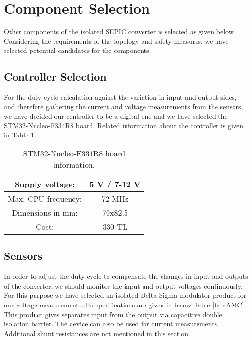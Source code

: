 \section{Component Selection}
Other components of the isolated SEPIC converter is selected as given below. Considering the requirements of the topology and safety measures, we have selected potential candidates for the components.

\subsection{Controller Selection}
For the duty cycle calculation against the variation in input and output sides, and therefore gathering the current and voltage measurements from the sensors, we have decided our controller to be a digital one and we have selected the STM32-Nucleo-F334R8 board. Related information about the controller is given in Table \ref{tab:controller}.

\begin{table}[H]
    \centering
    \caption{STM32-Nucleo-F334R8 board information.}
    \label{tab:controller}
    \begin{tabular}{|c|c|}
        \hline
        Supply voltage:         & 5 V / 7-12 V   \\
        \hline
        Max. CPU frequency:     & 72 MHz        \\
        \hline
        Dimensions in mm:       & 70x82.5       \\
        \hline
        Cost:                   & 330 TL        \\
        \hline
    \end{tabular}
\end{table}

\subsection{Sensors}
In order to adjust the duty cycle to compensate the changes in input and outputs of the converter, we should monitor the input and output voltages continuously. For this purpose we have selected an isolated Delta-Sigma modulator product for our voltage measurements. Its specifications are given in below Table \ref{tab:AMC}. This product gives separates input from the output via capacitive double isolation barrier. The device can also be used for current measurements. Additional shunt resistances are not mentioned in this section.

